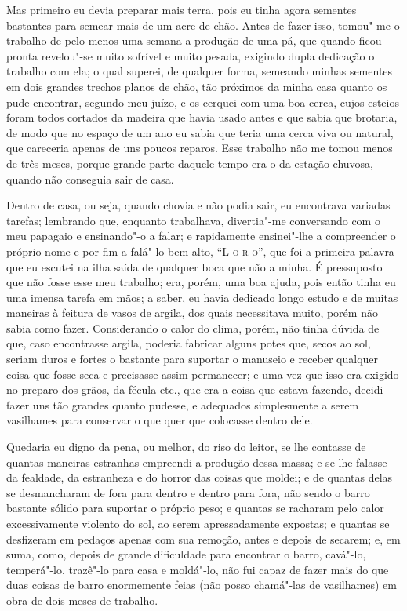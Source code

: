 Mas primeiro eu devia preparar mais terra, pois eu tinha agora sementes
bastantes para semear mais de um acre de chão. Antes de fazer isso,
tomou"-me o trabalho de pelo menos uma semana a produção de uma pá, que
quando ficou pronta revelou"-se muito sofrível e muito pesada, exigindo
dupla dedicação o trabalho com ela; o qual superei, de qualquer forma,
semeando minhas sementes em dois grandes trechos planos de chão, tão
próximos da minha casa quanto os pude encontrar, segundo meu juízo, e os
cerquei com uma boa cerca, cujos esteios foram todos cortados da madeira
que havia usado antes e que sabia que brotaria, de modo que no espaço de
um ano eu sabia que teria uma cerca viva ou natural, que careceria
apenas de uns poucos reparos. Esse trabalho não me tomou menos de três
meses, porque grande parte daquele tempo era o da estação chuvosa,
quando não conseguia sair de casa.

Dentro de casa, ou seja, quando chovia e não podia sair, eu encontrava
variadas tarefas; lembrando que, enquanto trabalhava, divertia"-me
conversando com o meu papagaio e ensinando"-o a falar; e rapidamente
ensinei"-lhe a compreender o próprio nome e por fim a falá"-lo bem alto,
``\textsc{L o r o}'', que foi a primeira palavra que eu escutei na ilha
saída de qualquer boca que não a minha. É pressuposto que não fosse esse
meu trabalho; era, porém, uma boa ajuda, pois então tinha eu uma imensa
tarefa em mãos; a saber, eu havia dedicado longo estudo e de muitas
maneiras à feitura de vasos de argila, dos quais necessitava muito,
porém não sabia como fazer. Considerando o calor do clima, porém, não
tinha dúvida de que, caso encontrasse argila, poderia fabricar alguns
potes que, secos ao sol, seriam duros e fortes o bastante para suportar
o manuseio e receber qualquer coisa que fosse seca e precisasse assim
permanecer; e uma vez que isso era exigido no preparo dos grãos, da
fécula etc., que era a coisa que estava fazendo, decidi fazer uns tão
grandes quanto pudesse, e adequados simplesmente a serem vasilhames para
conservar o que quer que colocasse dentro dele.

Quedaria eu digno da pena, ou melhor, do riso do leitor, se lhe contasse
de quantas maneiras estranhas empreendi a produção dessa massa; e se lhe
falasse da fealdade, da estranheza e do horror das coisas que moldei; e
de quantas delas se desmancharam de fora para dentro e dentro para fora,
não sendo o barro bastante sólido para suportar o próprio peso; e
quantas se racharam pelo calor excessivamente violento do sol, ao serem
apressadamente expostas; e quantas se desfizeram em pedaços apenas com
sua remoção, antes e depois de secarem; e, em suma, como, depois de
grande dificuldade para encontrar o barro, cavá"-lo, temperá"-lo, trazê"-lo
para casa e moldá"-lo, não fui capaz de fazer mais do que duas coisas de
barro enormemente feias (não posso chamá"-las de vasilhames) em obra de
dois meses de trabalho.

